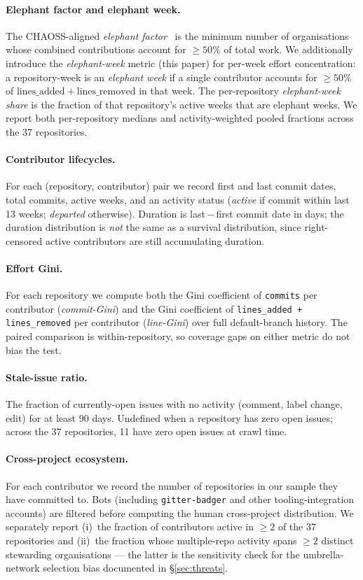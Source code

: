 \documentclass[a4paper,UKenglish,cleveref,autoref,thm-restate]{lipics-v2021}
\begin{document}
\paragraph{Elephant factor and elephant week.}
The CHAOSS-aligned \emph{elephant factor}~\cite{Goggins2021} is the minimum number of organisations whose combined contributions account for $\geq 50\%$ of total work. We additionally introduce the \emph{elephant-week} metric (this paper) for per-week effort concentration: a repository-week is an \emph{elephant week} if a single contributor accounts for $\geq 50\%$ of $\mathrm{lines\_added}+\mathrm{lines\_removed}$ in that week. The per-repository \emph{elephant-week share} is the fraction of that repository's active weeks that are elephant weeks. We report both per-repository medians and activity-weighted pooled fractions across the 37 repositories.

\paragraph{Contributor lifecycles.}
For each (repository, contributor) pair we record first and last commit dates, total commits, active weeks, and an activity status (\emph{active} if commit within last 13 weeks; \emph{departed} otherwise). Duration is last\,$-$\,first commit date in days; the duration distribution is \emph{not} the same as a survival distribution, since right-censored active contributors are still accumulating duration.

\paragraph{Effort Gini.}
For each repository we compute both the Gini coefficient of \texttt{commits} per contributor (\emph{commit-Gini}) and the Gini coefficient of \texttt{lines\_added + lines\_removed} per contributor (\emph{line-Gini}) over full default-branch history. The paired comparison is within-repository, so coverage gaps on either metric do not bias the test.

\paragraph{Stale-issue ratio.}
The fraction of currently-open issues with no activity (comment, label change, edit) for at least 90 days. Undefined when a repository has zero open issues; across the 37 repositories, 11 have zero open issues at crawl time.

\paragraph{Cross-project ecosystem.}
For each contributor we record the number of repositories in our sample they have committed to. Bots (including \texttt{gitter-badger} and other tooling-integration accounts) are filtered before computing the human cross-project distribution. We separately report (i)~the fraction of contributors active in $\geq 2$ of the 37 repositories and (ii)~the fraction whose multiple-repo activity spans $\geq 2$ distinct stewarding organisations --- the latter is the sensitivity check for the umbrella-network selection bias documented in \S\ref{sec:threats}.
\end{document}
